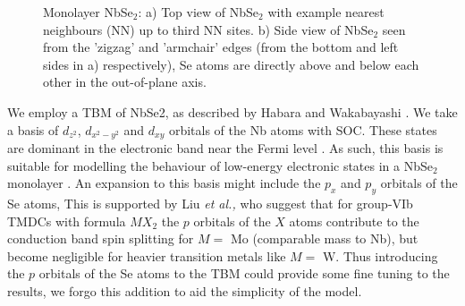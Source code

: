 \documentclass[12pt]{report} %
\begin{document}
\begin{figure}[t]
\begin{subfigure}[c]{0.475\textwidth}
    \caption{
    }
  \end{subfigure}
  \caption{
    Monolayer NbSe$_2$: a) Top view of NbSe$_2$ with example nearest neighbours (NN) up to third NN sites. b) Side view of NbSe$_2$ seen from the 'zigzag' and 'armchair' edges (from the bottom and left sides in a) respectively), Se atoms are directly above and below each other in the out-of-plane axis.
  }
\end{figure}

  We employ a TBM of NbSe2, as described by Habara and Wakabayashi \cite{Habara2021}. We take a basis of $d_{z^2}$, $d_{x^2 - y^2}$ and $d_{xy}$ orbitals of the Nb atoms with SOC. These states are dominant in the electronic band near the Fermi level \cite{Conte2019}. As such, this basis is suitable for modelling the behaviour of low-energy electronic states in a NbSe$_2$ monolayer \cite{Habara2021, Conte2019, Liu2013}. An expansion to this basis might include the $p_x$ and $p_y$ orbitals of the Se atoms, This is supported by Liu \textit{et al.,} \cite{Liu2013} who suggest that for group-VIb TMDCs with formula $MX_2$ the $p$ orbitals of the $X$ atoms contribute to the conduction band spin splitting for $M =$ Mo (comparable mass to Nb), but become negligible for heavier transition metals like $M =$ W. Thus introducing the $p$ orbitals of the Se atoms to the TBM could provide some fine tuning to the results, we forgo this addition to aid the simplicity of the model.
\end{document}
